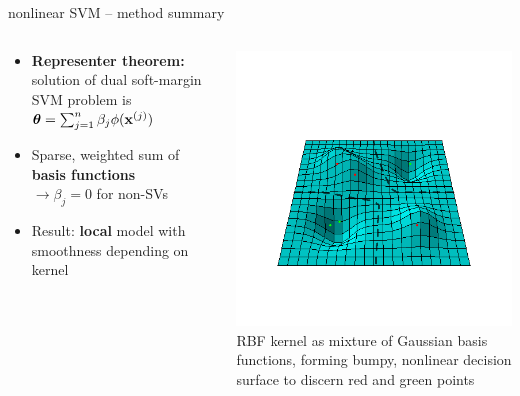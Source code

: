 \begin{frame}{nonlinear SVM -- method summary}
\begin{columns}[T, totalwidth=\textwidth]
\begin{column}{0.59\textwidth}
  \begin{itemize}
    \item \textbf{Representer theorem:} solution of dual soft-margin SVM problem is
    $\thetab = \sum_{j=1}^n \beta_j \phi (\xi[j] )$ \\
    \item Sparse, weighted sum of \textbf{basis functions}\\
    $\rightarrow \beta_j = 0$ 
    for non-SVs
    \item Result: \textbf{local} model with smoothness depending on kernel
  \end{itemize}
    \end{column}
        \begin{column}{0.4\textwidth}
        \centering
  \includegraphics[width=\textwidth, trim=50 100 50 150, clip]{
  figure/svm_rbf_as_basis.png} \\
  \tiny{RBF kernel as mixture of Gaussian basis functions, forming
  bumpy, nonlinear decision surface to discern red and green points}
    \end{column}
\end{columns}

\end{frame}


